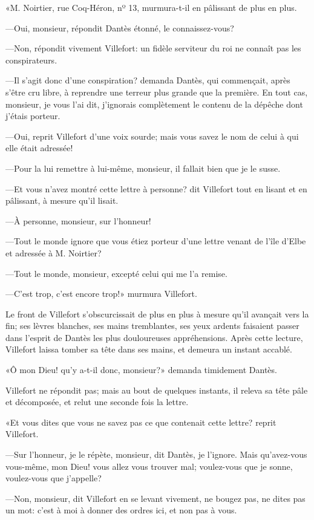 «M. Noirtier, rue Coq-Héron, nº 13, murmura-t-il en pâlissant de plus en plus.

—Oui, monsieur, répondit Dantès étonné, le connaissez-vous?

—Non, répondit vivement Villefort: un fidèle serviteur du roi ne connaît pas les conspirateurs.

—Il s'agit donc d'une conspiration? demanda Dantès, qui commençait, après s'être cru libre, à reprendre une terreur plus grande que la première. En tout cas, monsieur, je vous l'ai dit, j'ignorais complètement le contenu de la dépêche dont j'étais porteur.

—Oui, reprit Villefort d'une voix sourde; mais vous savez le nom de celui à qui elle était adressée!

—Pour la lui remettre à lui-même, monsieur, il fallait bien que je le susse.

—Et vous n'avez montré cette lettre à personne? dit Villefort tout en lisant et en pâlissant, à mesure qu'il lisait.

—À personne, monsieur, sur l'honneur!

—Tout le monde ignore que vous étiez porteur d'une lettre venant de l'île d'Elbe et adressée à M. Noirtier?

—Tout le monde, monsieur, excepté celui qui me l'a remise.

—C'est trop, c'est encore trop!» murmura Villefort.

Le front de Villefort s'obscurcissait de plus en plus à mesure qu'il avançait vers la fin; ses lèvres blanches, ses mains tremblantes, ses yeux ardents faisaient passer dans l'esprit de Dantès les plus douloureuses appréhensions. Après cette lecture, Villefort laissa tomber sa tête dans ses mains, et demeura un instant accablé.

«Ô mon Dieu! qu'y a-t-il donc, monsieur?» demanda timidement Dantès.

Villefort ne répondit pas; mais au bout de quelques instants, il releva sa tête pâle et décomposée, et relut une seconde fois la lettre.

«Et vous dites que vous ne savez pas ce que contenait cette lettre? reprit Villefort.

—Sur l'honneur, je le répète, monsieur, dit Dantès, je l'ignore. Mais qu'avez-vous vous-même, mon Dieu! vous allez vous trouver mal; voulez-vous que je sonne, voulez-vous que j'appelle?

—Non, monsieur, dit Villefort en se levant vivement, ne bougez pas, ne dites pas un mot: c'est à moi à donner des ordres ici, et non pas à vous.

